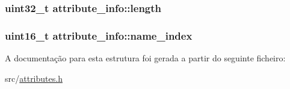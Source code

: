 \subsubsection[{\texorpdfstring{length}{length}}]{\setlength{\rightskip}{0pt plus 5cm}uint32\+\_\+t attribute\+\_\+info\+::length}\hypertarget{structattribute__info_a9528b298d46309f571f1f58c84cbd57c}{}\label{structattribute__info_a9528b298d46309f571f1f58c84cbd57c}
\subsubsection[{\texorpdfstring{name\+\_\+index}{name_index}}]{\setlength{\rightskip}{0pt plus 5cm}uint16\+\_\+t attribute\+\_\+info\+::name\+\_\+index}\hypertarget{structattribute__info_a7e925cf3d7a72731f1b6a6e4d1c24cc2}{}\label{structattribute__info_a7e925cf3d7a72731f1b6a6e4d1c24cc2}


A documentação para esta estrutura foi gerada a partir do seguinte ficheiro\+:\begin{DoxyCompactItemize}
\item 
src/\hyperlink{attributes_8h}{attributes.\+h}\end{DoxyCompactItemize}
